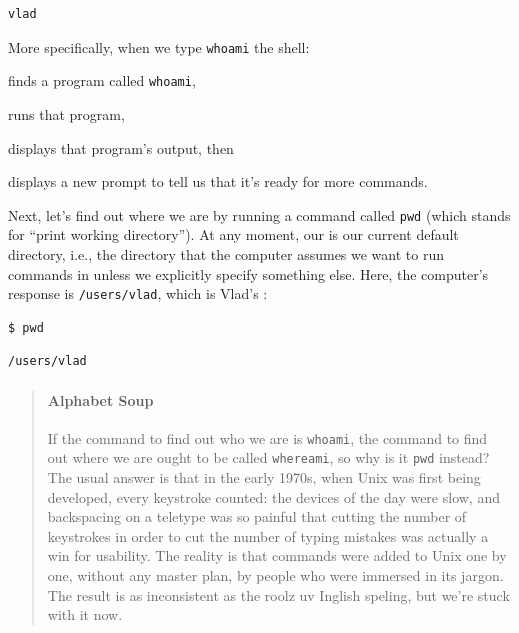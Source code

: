 \documentclass{book}
\begin{document}
\begin{verbatim}
vlad
\end{verbatim}

More specifically, when we type \texttt{whoami} the shell:

\begin{swcenumerate}
\item
  finds a program called \texttt{whoami},
\item
  runs that program,
\item
  displays that program's output, then
\item
  displays a new prompt to tell us that it's ready for more commands.
\end{swcenumerate}

Next, let's find out where we are by running a command called
\texttt{pwd} (which stands for ``print working directory''). At any
moment, our  is our current default directory, i.e., the directory that
the computer assumes we want to run commands in unless we explicitly
specify something else. Here, the computer's response is
\texttt{/users/vlad}, which is Vlad's :

\begin{verbatim}
$ pwd
\end{verbatim}

\begin{verbatim}
/users/vlad
\end{verbatim}

\begin{quote}
\mbox{}\paragraph{Alphabet Soup}

If the command to find out who we are is \texttt{whoami}, the command to
find out where we are ought to be called \texttt{whereami}, so why is it
\texttt{pwd} instead? The usual answer is that in the early 1970s, when
Unix was first being developed, every keystroke counted: the devices of
the day were slow, and backspacing on a teletype was so painful that
cutting the number of keystrokes in order to cut the number of typing
mistakes was actually a win for usability. The reality is that commands
were added to Unix one by one, without any master plan, by people who
were immersed in its jargon. The result is as inconsistent as the roolz
uv Inglish speling, but we're stuck with it now.
\end{quote}
\end{document}
